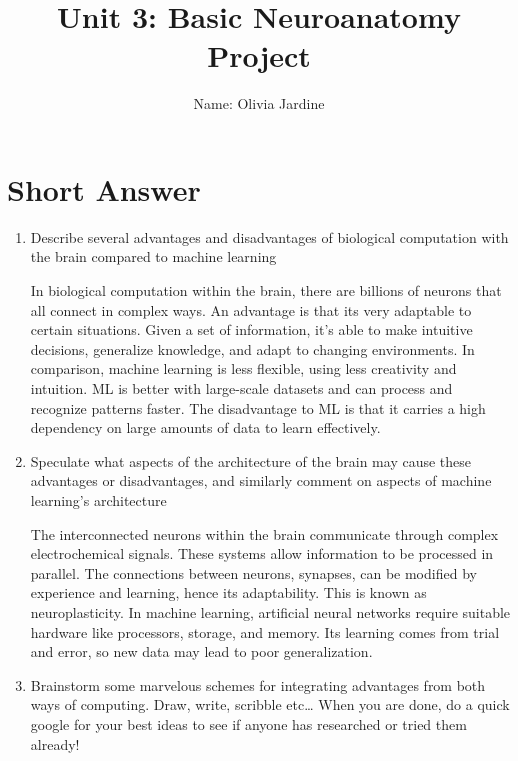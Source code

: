 \documentclass[letterpaper,11pt]{article}
\title{{\bf Unit 3: Basic Neuroanatomy Project}}
\author{Name: Olivia Jardine}
\date{}
\begin{document}
\maketitle

\section*{Short Answer}

\begin{enumerate}[label=\alph*)]

\item Describe several advantages and disadvantages of biological computation with the brain compared to machine learning

\begin{tcolorbox}
In biological computation within the brain, there are billions of neurons that all connect in complex ways. An advantage is that its very adaptable to certain situations. Given a set of information, it's able to make intuitive decisions, generalize knowledge, and adapt to changing environments. In comparison, machine learning is less flexible, using less creativity and intuition. ML is better with large-scale datasets and can process and recognize patterns faster. The disadvantage to ML is that it carries a high dependency on large amounts of data to learn effectively.
\end{tcolorbox}

\item Speculate what aspects of the architecture of the brain may cause these advantages or disadvantages, and similarly comment on aspects of machine learning’s architecture

\begin{tcolorbox}
The interconnected neurons within the brain communicate through complex electrochemical signals. These systems allow information to be processed in parallel. The connections between neurons, synapses, can be modified by experience and learning, hence its adaptability. This is known as neuroplasticity. In machine learning, artificial neural networks require suitable hardware like processors, storage, and memory. Its learning comes from trial and error, so new data may lead to poor generalization.
\end{tcolorbox} 

\item Brainstorm some marvelous schemes for integrating advantages from both ways of computing. Draw, write, scribble etc… When you are done, do a quick google for your best ideas to see if anyone has researched or tried them already!


\end{enumerate}
\end{document}
